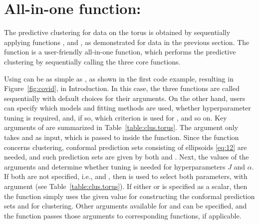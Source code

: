 \section{All-in-one function: }

The predictive clustering for data on the torus is obtained by sequentially applying functions ,  and , as demonstrated for  data in the previous section. The function  is a user-friendly all-in-one function, which performs the predictive clustering by sequentially calling the three core functions. 

Using  can be as simple as , as shown in the first code example, resulting in Figure~\ref{fig:covid}, in Introduction. In this case, the three functions are called sequentially with default choices for their arguments. On the other hand, users can specify which models and fitting methods are used, whether hyperparameter tuning is required, and, if so, which criterion is used for , and so on. 
%
Key arguments of  are summarized in Table~\ref{table:clus.torus}. 
The argument  only takes  and   as input, which is passed to  inside the function. Since the function concerns clustering, conformal prediction sets consisting of ellipsoids \eqref{eq:12} are needed, and such prediction sets are given by both  and  . 
Next, the values of the arguments  and  determine whether tuning is needed for hyperparameters $J$ and $\alpha$. If both are not specified, i.e.,  and , then  is used to select both parameters, with argument  (see  Table~\ref{table:clus.torus}). If either  or  is specified as a scalar, then the function simply uses the given value for constructing the conformal prediction sets and for clustering. Other arguments available for  and  can be specified, and the function passes those arguments to corresponding functions, if applicable.



